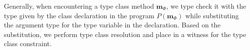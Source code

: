Generally, when encountering a type class method $\mathbf{m}_\Phi$, we type check it with the type given by the class declaration in the program $P(\mathbf{m}_\Phi)$ while substituting the argument type for the type variable in the declaration.
Based on the substitution, we perform type class resolution and place in a witness for the type class constraint.











